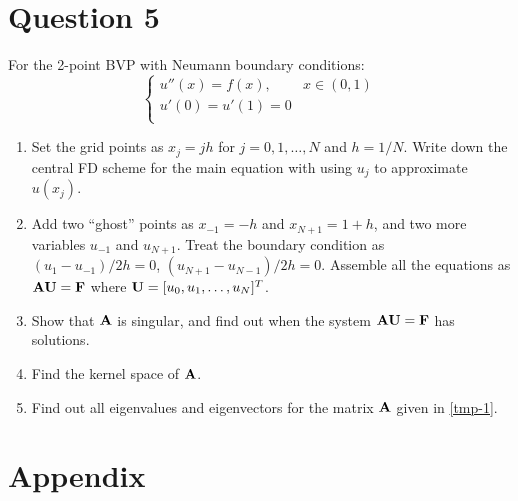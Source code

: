 \section{Question 5}
For the 2-point BVP with Neumann boundary conditions:
\[
    \begin{cases}
        u''(x) = f(x), & x\in(0, 1) \\
        u'(0) = u'(1) = 0 & \\
    \end{cases}
\]
\begin{enumerate}[label=(\alph*)]
    \item Set the grid points as $x_j=jh$ for $j=0,1,\ldots,N$ and $h=1/N$. Write down the central FD scheme for the main equation with using $u_j$ to approximate $u(x_j)$.
    \item\label{tmp-1} Add two ``ghost'' points as $x_{-1}=-h$ and $x_{N+1}=1+h$, and two more variables $u_{-1}$ and $u_{N+1}$. Treat the boundary condition as $(u_1-u_{-1})/2h=0$, $(u_{N+1}-u_{N-1})/2h=0$. Assemble all the equations as $\vb{A}\vb{U}=\vb{F}$ where $\vb{U}=[u_0, u_1, \ldots, u_N]^T$.
    \item Show that $\vb{A}$ is singular, and find out when the system $\vb{A}\vb{U}=\vb{F}$ has solutions.
    \item Find the kernel space of $\vb{A}$.
    \item Find out all eigenvalues and eigenvectors for the matrix $\vb{A}$ given in \ref{tmp-1}.
\end{enumerate}



\section{Appendix}\label{S:appendix-1}
\begin{appendices}
\end{appendices}
